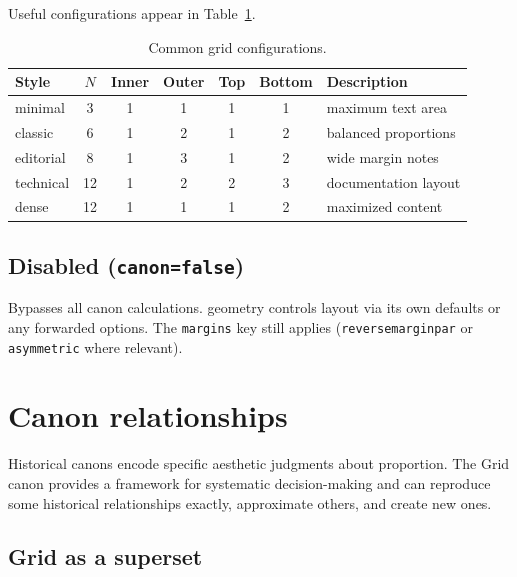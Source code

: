 \documentclass[11pt, twoside, openany]{book}
\newcommand{\pkg}[1]{\textsf{#1}}
\begin{document}
Useful configurations appear in Table~\ref{tab:useful}.

\begin{table}[h]
	\centering
	\caption{Common grid configurations.}
	\label{tab:useful}
	\begin{tabular}{@{}lccccc l@{}}
		\toprule
		\bfseries Style & $N$ & \bfseries Inner & \bfseries Outer & \bfseries Top & \bfseries Bottom & \bfseries Description \\
		\midrule
		minimal         & 3   & 1               & 1               & 1             & 1                & maximum text area     \\
		classic         & 6   & 1               & 2               & 1             & 2                & balanced proportions  \\
		editorial       & 8   & 1               & 3               & 1             & 2                & wide margin notes     \\
		technical       & 12  & 1               & 2               & 2             & 3                & documentation layout  \\
		dense           & 12  & 1               & 1               & 1             & 2                & maximized content     \\
		\bottomrule
	\end{tabular}
\end{table}

\section{Disabled (\texttt{canon=false})}\label{sec:false}

Bypasses all canon calculations. \pkg{geometry} controls layout via its own defaults or any forwarded options. The \texttt{margins} key still applies (\texttt{reversemarginpar} or \texttt{asymmetric} where relevant).


\chapter{Canon relationships}\label{chapter:relationships}

Historical canons encode specific aesthetic judgments about proportion. The Grid canon provides a framework for systematic decision-making and can reproduce some historical relationships exactly, approximate others, and create new ones.

\section{Grid as a superset}\label{sec:superset}
\end{document}
